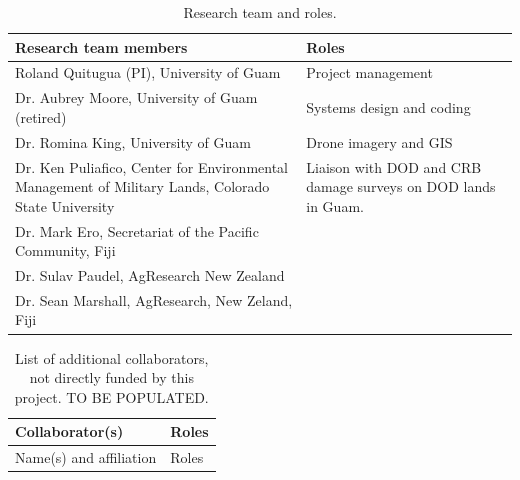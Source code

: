 \documentclass[11pt,english,letterpaper]{scrartcl}
\begin{document}
\begin{table}[h]
	\centering
	\caption{Research team and roles.}	
	
	\begin{tabular}{p{2.2in}p{4in}}
		\toprule
		\textbf{Research team members} & \textbf{Roles} \\ \midrule
		
		Roland Quitugua (PI), University of Guam & Project management \\ \midrule
		
		Dr. Aubrey Moore, University of Guam (retired) & Systems design and coding \\ \midrule
		
		Dr. Romina King, University of Guam & Drone imagery and GIS \\ \midrule
		
		Dr. Ken Puliafico, Center for Environmental Management of Military Lands, Colorado State University & Liaison with DOD and CRB damage surveys on DOD lands in Guam. \\ \midrule
		
		Dr. Mark Ero, Secretariat of the Pacific Community, Fiji & \\ \midrule
		
		Dr. Sulav Paudel, AgResearch New Zealand & \\ \midrule
		
		Dr. Sean Marshall, AgResearch, New Zeland, Fiji & \\ \bottomrule	
		
	\end{tabular}
	\label{tbl:team}
	
\end{table}

\begin{table}[h]
	\centering
	\caption{List of additional collaborators, not directly funded by this project. TO BE POPULATED.}	
	
	\begin{tabular}{p{2.2in}p{4in}}
		\toprule
		\textbf{Collaborator(s)} & \textbf{Roles} \\ \midrule
		
		Name(s) and affiliation & Roles \\ \midrule
				
	\end{tabular}
	\label{tbl:team-additional}	
\end{table}



\clearpage
\end{document}
